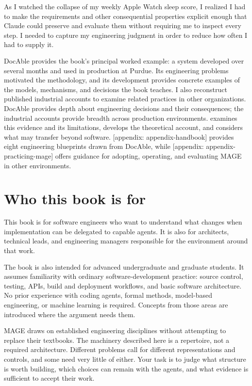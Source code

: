 As I watched the collapse of my weekly Apple Watch sleep score, I realized I had
to make the requirements and other consequential properties explicit
enough that Claude could preserve and evaluate them
without requiring me to inspect every step.
I needed to capture my engineering judgment in order to reduce how often I had to supply it.

DocAble provides the book's principal worked example: a system developed over several months and used in production at Purdue. Its engineering problems motivated the methodology, and its development provides concrete examples of the models, mechanisms, and decisions the book teaches. I also reconstruct published industrial accounts to examine related practices in other organizations. DocAble provides depth about engineering decisions and their consequences; the industrial accounts provide breadth across production environments.  examines this evidence and its limitations,  develops the theoretical account, and  considers what may transfer beyond software. {[}appendix: appendix-handbook{]} provides eight engineering blueprints drawn from DocAble, while {[}appendix: appendix-practicing-mage{]} offers guidance for adopting, operating, and evaluating MAGE in other environments.

\section{Who this book is for}\label{heading:who-this-book-is-for}

This book is for software engineers who want to understand what changes
when implementation can be delegated to capable agents. It is also for
architects, technical leads, and engineering managers responsible for
the environment around that work.

The book is also intended for advanced undergraduate and graduate
students. It assumes familiarity with ordinary software-development
practice: source control, testing, APIs, build and deployment workflows,
and basic software architecture. No prior experience with coding agents,
formal methods, model-based engineering, or machine learning is
required. Concepts from those areas are introduced where the argument
needs them.

MAGE draws on established engineering disciplines without attempting to
replace their textbooks. The machinery described here is a repertoire,
not a required architecture. Different problems call for different
representations and controls, and some need very little of either. Your
task is to judge what structure is worth building, which choices can
remain with the agents, and what evidence is sufficient to accept their
work. 
